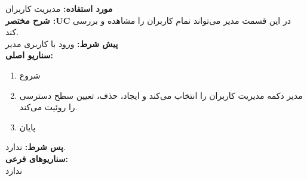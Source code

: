 \textbf{مورد استفاده:}
مدیریت  کاربران
\\
\textbf{شرح مختصر :UC}
در این قسمت مدیر می‌تواند تمام کاربران را مشاهده و بررسی ‌کند.
\\
\textbf{پيش شرط:}
ورود با کاربری مدیر
\\
\textbf{سناريو اصلی:}
\begin{enumerate}
	\item
	شروع
	\item
	مدیر دکمه مدیریت کاربران را انتخاب می‌کند و ایجاد، حذف، تعیین سطح دسترسی را روئیت می‌کند.
	\item
	پایان
\end{enumerate}

\noindent
\textbf{پس شرط:}
ندارد.
\\
\textbf{سناريوهای فرعی:}
\\
ندارد

